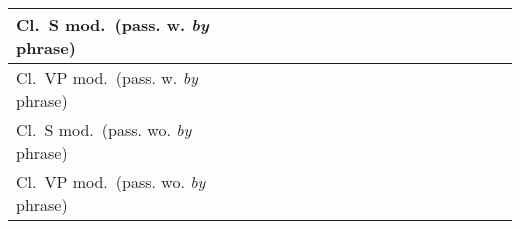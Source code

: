 \begin{center}
\begin{tabular}{|p{2.4in}||*{16}{c|}}
\hline
Cl.\ S mod.\ (pass. w. {\it by} phrase) & & & & & & & & & & & & & & & & \\
\hline
Cl.\ VP mod.\ (pass. w. {\it by} phrase) & & & & & & & & & & & & & & & & \\
\hline
Cl.\ S mod.\ (pass. wo. {\it by} phrase) & & & & & & & & & & & & & & & & \\
\hline
Cl.\ VP mod.\ (pass. wo. {\it by} phrase) & & & & & & & & & & & & & & & & \\
\hline
\end{tabular}
\end{center}

\clearpage




